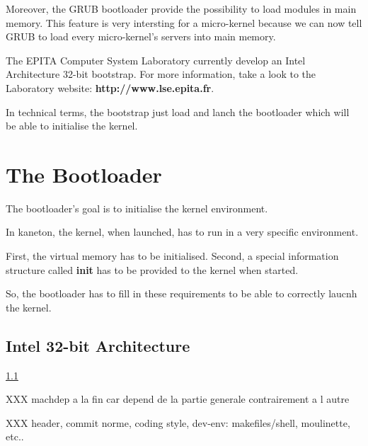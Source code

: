Moreover, the GRUB bootloader provide the possibility to load
modules in main memory. This feature is very intersting for a micro-kernel
because we can now tell GRUB to load every micro-kernel's servers into
main memory.

The EPITA Computer System Laboratory currently develop an Intel Architecture
32-bit bootstrap. For more information, take a look to the Laboratory
website: \textbf{http://www.lse.epita.fr}.

In technical terms, the bootstrap just load and lanch the bootloader
which will be able to initialise the kernel.



\section{The Bootloader}

The bootloader's goal is to initialise the kernel environment.

In kaneton, the kernel, when launched, has to run in a very specific
environment.

First, the virtual memory has to be initialised. Second, a special
information structure called \textbf{init} has to be provided to
the kernel when started.

So, the bootloader has to fill in these requirements to be able
to correctly laucnh the kernel.

\subsection{Intel 32-bit Architecture}


\label{}
\ref{}
\pageref{}

XXX machdep a la fin car depend de la partie generale contrairement a l autre

XXX header, commit norme, coding style, dev-env: makefiles/shell, moulinette,
    etc..